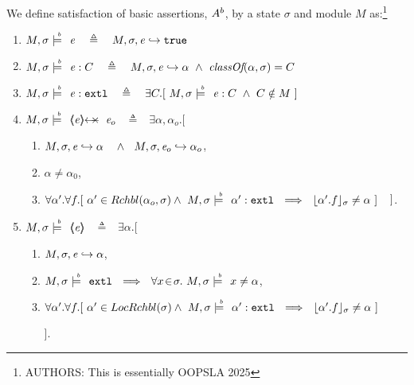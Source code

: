\begin{definition} 
\label{def:chainmail-semantics}
\label{def:chainmail-protection-from}
\label{sect:semantics:assert:prtFrom}
 \label{def:chainmail-protection}
 We define satisfaction of basic assertions, $A^{b}$, by a %
state $\sigma$ and 
 module $M$ as:\footnote{AUTHORS: This is essentially OOPSLA 2025}
\begin{enumerate}
\item
\label{cExpr}
$\satisfiesAB{M}{\sigma}{{\re}}\ \ \ \triangleq \ \ \   \eval{M}{\sigma}{{\re}}{\true}$
\item
\label{cClass}
$\satisfiesAB{M}{\sigma}{{{\re}} : C}\ \ \ \triangleq \ \ \   \eval{M}{\sigma}{{\re}}{\alpha}\   \wedge \ \class{\alpha} {\sigma}= C$
\item
\label{cExternal}
$\satisfiesAB{M}{\sigma}{\external{{\re}}} \ \ \ \triangleq \ \ \  \exists C.[\ \satisfiesAB{M}{\sigma}{{{\re}} : C} \ \wedge \ C \notin M \ ]$
 
 \item
 \label{cProtected}
$\satisfiesAB{M}{\sigma}{\protectedFrom{{\re}} {{\re_{o}}}}$ $\ \  \triangleq\ \ $
$\exists \alpha, \alpha_{o}. [$ 
  \begin{enumerate}
 \item
 $ \eval{M}{\sigma}{{\re}}{\alpha}\ \ \ \wedge\ \ \eval{M}{\sigma}{{\re_o}}{\alpha_o}$,
  \item
$\alpha\neq \alpha_0$,
 \item
$\forall \alpha'.\forall f.[\ \alpha' \in {\ensuremath{Rchbl(\alpha_o,\sigma)}} \wedge\   M , \sigma \models\!\!\!\!^{^b}\ \ {\alpha':\mbox{\normalfont{\texttt{extl}}}} 
\ \ \Longrightarrow \ \  
  \lfloor \alpha'.f \rfloor_{\sigma} \neq \alpha     \ ] $  $  \strut \hspace{.25cm} ] $.
\end{enumerate}

\item
 \label{sect:semantics:assert:prt}
$\satisfiesAB{M}{\sigma}{\inside{{\re}}} $ $\ \  \triangleq\ \  $ 
$\exists \alpha. [$  
\begin{enumerate}
\item
$ M, \sigma, {\mathit{e}} \hookrightarrow \alpha$,
 \item 
 $\satisfiesAB{M}{\sigma}{\extThis}\ \ \Longrightarrow\ \ \forall x\!\in\! \sigma.\ \satisfiesAB{M}{\sigma}{x\neq \alpha}$,
 \item
$\forall \alpha'.\forall f.[\ \alpha' \in {\ensuremath{LocRchbl(\sigma)}} \wedge\   M , \sigma \models\!\!\!\!^{^b}\ \ {\alpha':\mbox{\normalfont{\texttt{extl}}}} 
\ \ \Longrightarrow \ \  
  \lfloor \alpha'.f \rfloor_{\sigma} \neq \alpha     \ ]$ 
 \strut \hspace{.25cm} ].    \end{enumerate} 
 

\end{enumerate}
\end{definition}
